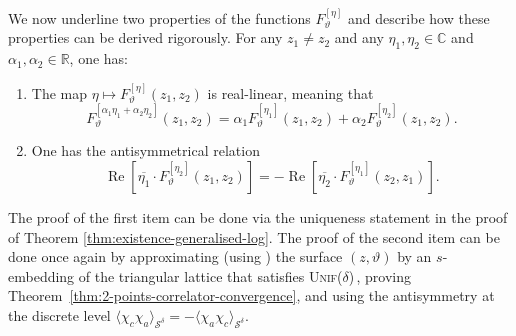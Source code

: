 \documentclass[reqno]{amsart}
\numberwithin{equation}{section}
\theoremstyle{definition}
\theoremstyle{remark}
\renewcommand\Re{\operatorname{Re}}
\newcommand\cS{\mathcal{S}}
\newcommand\Unif{{\mbox{\textsc{Unif(}$\delta$\textsc{)}}}}
\begin{document}
We now underline two properties of the functions $F^{[\eta]}_{\vartheta}$ and describe how these properties can be derived rigorously. For any $z_1 \neq z_2$ and any $\eta_1, \eta_2 \in \mathbb{C}$ and $\alpha_1, \alpha_2 \in \mathbb{R}$, one has:
\begin{enumerate}
    \item The map $\eta \mapsto F^{[\eta]}_{\vartheta}(z_1, z_2)$ is real-linear, meaning that
    \begin{equation}
        F^{[\alpha_1 \eta_1 + \alpha_2 \eta_2]}_{\vartheta}(z_1, z_2)
        = \alpha_1 F^{[\eta_1]}_{\vartheta}(z_1, z_2)
        + \alpha_2 F^{[\eta_2]}_{\vartheta}(z_1, z_2).
    \end{equation}

    \item One has the antisymmetrical relation
    \begin{equation}\label{eq:antisymetry-continuous-fermions}
        \Re[\overline{\eta_1} \cdot F^{[\eta_2]}_{\vartheta}(z_1, z_2)]
        = -\Re[\overline{\eta_2} \cdot F^{[\eta_1]}_{\vartheta}(z_2, z_1)].
    \end{equation}
\end{enumerate}

The proof of the first item can be done via the uniqueness statement in the proof of Theorem \ref{thm:existence-generalised-log}. The proof of the second item can be done once again by approximating (using \cite[Remark 1.3]{Par25}) the surface $(z, \vartheta)$ by an $s$-embedding of the triangular lattice that satisfies \Unif\,, proving Theorem~\ref{thm:2-points-correlator-convergence}, and using the antisymmetry at the discrete level $\langle \chi_c \chi_a \rangle_{\cS^\delta} = - \langle \chi_a \chi_c \rangle_{\cS^\delta}$. 
\end{document}
